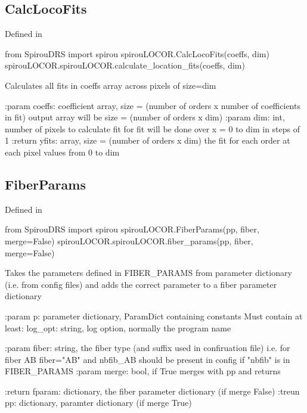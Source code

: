 \begin{minipage}{\textwidth}
\subsection{CalcLocoFits}

Defined in \spirouLOCOR{}

\begin{pythonbox}
from SpirouDRS import spirou
spirouLOCOR.CalcLocoFits(coeffs, dim)
spirouLOCOR.spirouLOCOR.calculate_location_fits(coeffs, dim)
\end{pythonbox}

\begin{pythondocstring}
Calculates all fits in coeffs array across pixels of size=dim

:param coeffs: coefficient array,
               size = (number of orders x number of coefficients in fit)
               output array will be size = (number of orders x dim)
:param dim: int, number of pixels to calculate fit for
            fit will be done over x = 0 to dim in steps of 1
:return yfits: array,
               size = (number of orders x dim)
               the fit for each order at each pixel values from 0 to dim
\end{pythondocstring}
\end{minipage}

\begin{minipage}{\textwidth}
\subsection{FiberParams}

Defined in \spirouLOCOR{}

\begin{pythonbox}
from SpirouDRS import spirou
spirouLOCOR.FiberParams(pp, fiber, merge=False)
spirouLOCOR.spirouLOCOR.fiber_params(pp, fiber, merge=False)
\end{pythonbox}

\begin{pythondocstring}
Takes the parameters defined in FIBER_PARAMS from parameter dictionary
(i.e. from config files) and adds the correct parameter to a fiber
parameter dictionary

:param p: parameter dictionary, ParamDict containing constants
    Must contain at least:
            log_opt: string, log option, normally the program name

:param fiber: string, the fiber type (and suffix used in confiruation file)
              i.e. for fiber AB fiber="AB" and nbfib_AB should be present
              in config if "nbfib" is in FIBER_PARAMS
:param merge: bool, if True merges with pp and returns

:return fparam: dictionary, the fiber parameter dictionary (if merge False)
:treun pp: dictionary, paramter dictionary (if merge True)
\end{pythondocstring}
\end{minipage}

